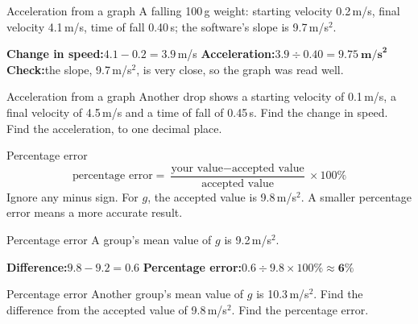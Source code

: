 \begin{center}
\end{center}

\begin{workedex}{Acceleration from a graph}
A falling 100\,g weight: starting velocity 0.2\,m/s, final velocity 4.1\,m/s, time of fall 0.40\,s; the software's slope is 9.7\,m/s$^2$.

\smallskip
\textbf{Change in speed:}\quad $4.1 - 0.2 = 3.9$\,m/s \qquad \textbf{Acceleration:}\quad $3.9 \div 0.40 = \mathbf{9.75\ \text{m/s}^2}$\\
\textbf{Check:}\quad the slope, 9.7\,m/s$^2$, is very close, so the graph was read well.
\end{workedex}

\begin{wedo}{Acceleration from a graph}
Another drop shows a starting velocity of 0.1\,m/s, a final velocity of 4.5\,m/s and a time of fall of 0.45\,s.
Find the change in speed.
Find the acceleration, to one decimal place.
\end{wedo}

\begin{infobox}{Percentage error}
\[ \text{percentage error} = \frac{\text{your value} - \text{accepted value}}{\text{accepted value}} \times 100\% \]
Ignore any minus sign. For $g$, the accepted value is 9.8\,m/s$^2$. A smaller percentage error means a more accurate result.
\end{infobox}

\begin{workedex}{Percentage error}
A group's mean value of $g$ is 9.2\,m/s$^2$.

\smallskip
\textbf{Difference:}\quad $9.8 - 9.2 = 0.6$ \qquad \textbf{Percentage error:}\quad $0.6 \div 9.8 \times 100\% \approx \mathbf{6\%}$
\end{workedex}

\begin{wedo}{Percentage error}
Another group's mean value of $g$ is 10.3\,m/s$^2$.
Find the difference from the accepted value of 9.8\,m/s$^2$.
Find the percentage error.
\end{wedo}


